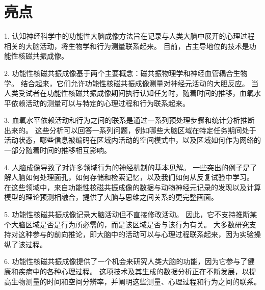 \section{亮点}

1. 认知神经科学中的功能性大脑成像方法旨在记录与人类大脑中展开的心理过程相关的大脑活动，将生物学和行为测量联系起来。
目前，占主导地位的技术是功能性核磁共振成像。 

2. 功能性核磁共振成像基于两个主要概念：磁共振物理学和神经血管耦合生物学。
结合起来，它们允许功能性核磁共振成像测量对神经元活动的大胆反应。
当人类受试者在功能性核磁共振成像期间执行认知任务时，随着时间的推移，血氧水平依赖活动的测量可以与特定的心理过程和行为联系起来。

3. 血氧水平依赖活动和行为之间的联系是通过一系列预处理步骤和统计分析推断出来的。
这些分析可以回答一系列问题，例如哪些大脑区域在特定任务期间处于活动状态，哪些信息被编码在区域内活动的空间模式中，以及区域如何作为网络的一部分随着时间的推移相互影响。


4. 人脑成像导致了对许多领域行为的神经机制的基本见解。
一些突出的例子是了解人脑如何处理面孔，如何存储和检索记忆，以及我们如何从反复试验中学习。
在这些领域中，来自功能性核磁共振成像的数据与动物神经元记录的发现以及计算模型的理论预测相融合，提供了大脑与思维之间关系的更完整画面。


5. 功能性核磁共振成像记录大脑活动但不直接修改活动。
因此，它不支持推断某个大脑区域是否是行为所必需的，而是该区域是否与该行为有关。
大多数研究支持对这种参与的前向推论，即大脑中的活动可以与心理过程联系起来，因为实验操纵了该过程。


6. 功能性核磁共振成像提供了一个机会来研究人类大脑的功能，因为它参与了健康和疾病中的各种心理过程。 
这项技术及其生成的数据分析正在不断发展，以提高生物测量的时间和空间分辨率，并阐明这些测量、心理过程和行为之间的联系。


